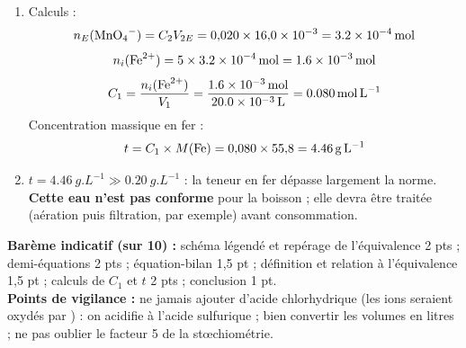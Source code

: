 \documentclass[11pt]{article}
\begin{document}
\begin{corrige}
\begin{enumerate}
\[ \frac{n_E(\ce{MnO4-})}{1} = \frac{n_i(\ce{Fe^2+})}{5} \quad \Longleftrightarrow \quad n_i(\ce{Fe^2+}) = 5\, C_2 V_{2E} \]
\item Calculs :
\[ n_E(\ce{MnO4-}) = C_2 V_{2E} = 0{,}020 \times 16{,}0\times 10^{-3} = \SI{3,2e-4}{mol} \]
\[ n_i(\ce{Fe^2+}) = 5 \times \SI{3,2e-4}{mol} = \SI{1,6e-3}{mol} \]
\[ C_1 = \frac{n_i(\ce{Fe^2+})}{V_1} = \frac{\SI{1,6e-3}{mol}}{\SI{20,0e-3}{L}} = \SI{0,080}{mol.L^{-1}} \]
Concentration massique en fer :
\[ t = C_1 \times M(\ce{Fe}) = 0{,}080 \times 55{,}8 = \SI{4,46}{g.L^{-1}} \]
\item $t = \SI{4,46}{g.L^{-1}} \gg \SI{0,20}{g.L^{-1}}$ : la teneur en fer dépasse largement la norme. \textbf{Cette eau n'est pas conforme} pour la boisson ; elle devra être traitée (aération puis filtration, par exemple) avant consommation.
\end{enumerate}
\textbf{Barème indicatif (sur 10) :} schéma légendé et repérage de l'équivalence 2 pts ; demi-équations 2 pts ; équation-bilan 1,5 pt ; définition et relation à l'équivalence 1,5 pt ; calculs de $C_1$ et $t$ 2 pts ; conclusion 1 pt.\\
\textbf{Points de vigilance :} ne jamais ajouter d'acide chlorhydrique (les ions  seraient oxydés par ) : on acidifie à l'acide sulfurique ; bien convertir les volumes en litres ; ne pas oublier le facteur 5 de la stœchiométrie.
\end{corrige}
\end{document}
